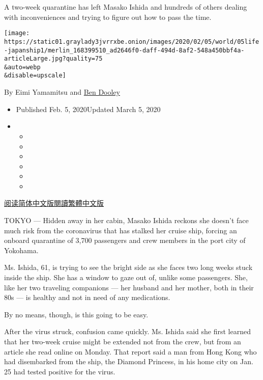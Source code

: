 A two-week quarantine has left Masako Ishida and hundreds of others
dealing with inconveniences and trying to figure out how to pass the
time.

\texttt{[image: https://static01.graylady3jvrrxbe.onion/images/2020/02/05/world/05life-japanship1/merlin\_168399510\_ad2646f0-daff-494d-8af2-548a450bbf4a-articleLarge.jpg?quality=75\\\&auto=webp\\\&disable=upscale]}

By Eimi Yamamitsu and
\href{https://www.nytimes3xbfgragh.onion/by/ben-dooley}{Ben Dooley}

\begin{itemize}
\item
  Published Feb. 5, 2020Updated March 5, 2020
\item
  \begin{itemize}
  \item
  \item
  \item
  \item
  \item
  \item
  \end{itemize}
\end{itemize}

\href{https://cn.nytimes3xbfgragh.onion/asia-pacific/20200206/japan-coronavirus-cruise-ship/}{阅读简体中文版}\href{https://cn.nytimes3xbfgragh.onion/asia-pacific/20200206/japan-coronavirus-cruise-ship/zh-hant/}{閱讀繁體中文版}

TOKYO --- Hidden away in her cabin, Masako Ishida reckons she doesn't
face much risk from the coronavirus that has stalked her cruise ship,
forcing an onboard quarantine of 3,700 passengers and crew members in
the port city of Yokohama.

Ms. Ishida, 61, is trying to see the bright side as she faces two long
weeks stuck inside the ship. She has a window to gaze out of, unlike
some passengers. She, like her two traveling companions --- her husband
and her mother, both in their 80s --- is healthy and not in need of any
medications.

By no means, though, is this going to be easy.

After the virus struck, confusion came quickly. Ms. Ishida said she
first learned that her two-week cruise might be extended not from the
crew, but from an article she read online on Monday. That report said a
man from Hong Kong who had disembarked from the ship, the Diamond
Princess, in his home city on Jan. 25 had tested positive for the virus.


